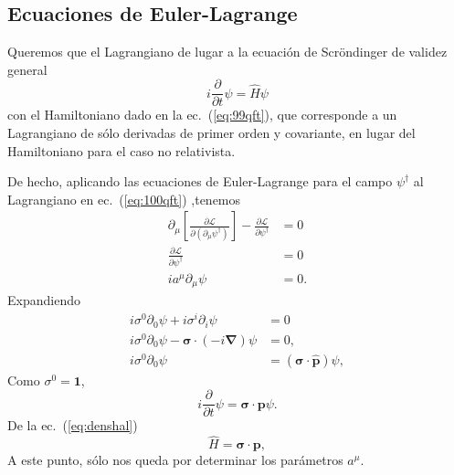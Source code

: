 \subsection{Ecuaciones de Euler-Lagrange}
\label{sec:ecuaciones-de-euler}
Queremos que el Lagrangiano de lugar a la ecuación de Scröndinger de validez general
\begin{equation}
  \label{eq:grlsch}
  i\frac{\partial}{\partial t}\psi=\hat{H} \psi
\end{equation}
con el Hamiltoniano dado en la ec.~(\ref{eq:99qft}), que corresponde a un Lagrangiano de sólo derivadas de primer orden y covariante, en lugar del Hamiltoniano para el caso no relativista. 

De hecho, aplicando las ecuaciones de Euler-Lagrange para el campo $\psi^\dagger$ al Lagrangiano en ec.~(\ref{eq:100qft}) ,tenemos
\begin{align}
  \partial_\mu\left[\frac{\partial\mathcal{L}}{\partial\left(\partial_\mu\psi^\dagger\right)}\right]-\frac{\partial\mathcal{L}}{\partial\psi^\dagger}&=0\nonumber\\
  \frac{\partial\mathcal{L}}{\partial\psi^\dagger}&=0\nonumber\\
  \label{eq:114qftm}
  i a^\mu\partial_\mu\psi&=0.
\end{align}
Expandiendo
\begin{align*}
  i \sigma^0\partial_0\psi+i \sigma^i\partial_i\psi&=0\\
  i \sigma^0\partial_0\psi-\boldsymbol\sigma\cdot(-i\boldsymbol{\nabla})\psi&=0,\\
  i \sigma^0\partial_0\psi&=(\boldsymbol\sigma\cdot\hat{\mathbf{p}})\psi,
\end{align*}
Como $\sigma^0=\mathbf{1}$,
\begin{equation}
    i\frac{\partial}{\partial t}\psi=\boldsymbol\sigma\cdot\mathbf{p}\psi.
\end{equation}
De la ec.~(\ref{eq:denshal})
\begin{equation}
  \label{eq:186qft}
  \hat{H}= \boldsymbol\sigma\cdot\mathbf{p},
\end{equation}
A este punto, sólo nos queda por determinar los parámetros $a^\mu$. 

